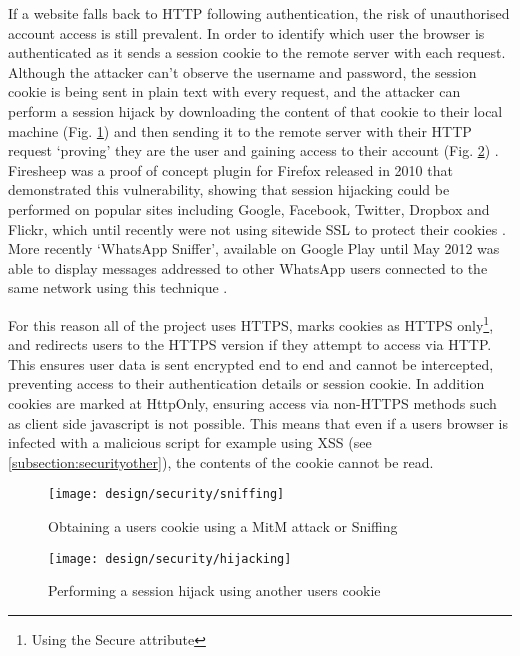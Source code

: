 If a website falls back to HTTP following authentication, the risk of unauthorised account access is still prevalent.
%
In order to identify which user the browser is authenticated as it sends a session cookie to the remote server with each request. 
%
Although the attacker can't observe the username and password, the session cookie is being sent in plain text with every request, and the attacker can perform a session hijack by downloading the content of that cookie to their local machine (Fig. \ref{fig:securitysniffing}) and then sending it to the remote server with their HTTP request `proving' they are the user and gaining access to their account (Fig. \ref{fig:securityhijacking}) \parencite{owasp2011sessionhihacking}.
% 
Firesheep was a proof of concept plugin for Firefox released in 2010 that demonstrated this vulnerability, showing that session hijacking could be performed on popular sites including Google, Facebook, Twitter, Dropbox and Flickr, which until recently were not using sitewide SSL to protect their cookies \parencite{butler2010firesheep, butler2014firesheep}. 
%
More recently `WhatsApp Sniffer', available on Google Play until May 2012 was able to display messages addressed to other WhatsApp users connected to the same network using this technique \parencite{thehsecurity2012whatsapp}.

For this reason all of the project uses HTTPS, marks cookies as HTTPS only\footnote{Using the Secure attribute}, and redirects users to the HTTPS version if they attempt to access via HTTP. This ensures user data is sent encrypted end to end and cannot be intercepted, preventing access to their authentication details or session cookie.
%
In addition cookies are marked at HttpOnly, ensuring access via non-HTTPS methods such as client side javascript is not possible. This means that even if a users browser is infected with a malicious script for example using XSS (see \ref{subsection:securityother}), the contents of the cookie cannot be read.

\begin{figure}[h]
    \centering
    \texttt{[image: design/security/sniffing]}
    \caption[Obtaining a users cookie using a MitM attack or sniffing]{Obtaining a users cookie using a MitM attack or Sniffing \parencite{owasp2011sessionhihacking}}
    \label{fig:securitysniffing}
\end{figure}

\begin{figure}[h]
    \centering
    \texttt{[image: design/security/hijacking]}
    \caption{Performing a session hijack using another users cookie \parencite{owasp2011sessionhihacking}}
    \label{fig:securityhijacking}
\end{figure}

